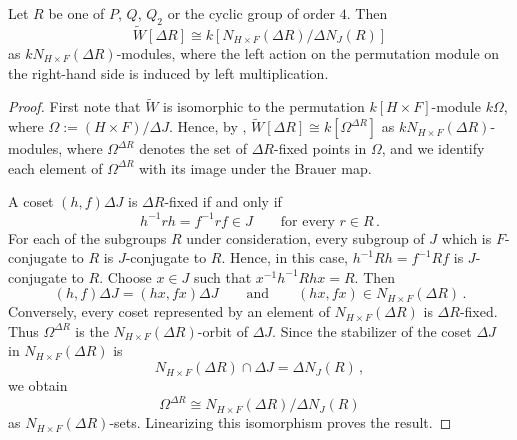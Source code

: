 \begin{lem}\label{lem:Brauer-fixed-points-W}
Let $R$ be one of $P$, $Q$, $Q_2$ or the cyclic group of order $4$. Then
\[
\widetilde{W}[\Delta R]\cong k[N_{H\times F}(\Delta R)/\Delta N_J(R)]
\]
as $kN_{H\times F}(\Delta R)$-modules, where the left action on the permutation module on the right-hand side is induced by left multiplication.
\end{lem}
\begin{proof}
    First note that $\widetilde{W}$ is isomorphic to the permutation $k[H\times F]$-module $k\Omega$, where $\Omega:=(H\times F)/\Delta J$. Hence, by \cite[Proposition~5.8.1]{LinckelmannVol1}, $\widetilde{W}[\Delta R]\cong k[\Omega^{\Delta R}]$ as $kN_{H\times F}(\Delta R)$-modules, where $\Omega^{\Delta R}$ denotes the set of $\Delta R$-fixed points in $\Omega$, and we identify each element of $\Omega^{\Delta R}$ with its image under the Brauer map.

    A coset $(h,f)\Delta J$ is $\Delta R$-fixed if and only if 
    \[
    h^{-1}rh=f^{-1}rf\in J\qquad \text{for every } r\in R\,.
    \]
    For each of the subgroups $R$ under consideration, every subgroup of
    $J$ which is $F$-conjugate to $R$ is $J$-conjugate to $R$. Hence, in this case, $h^{-1}Rh=f^{-1}Rf$ is $J$-conjugate to $R$. Choose $x\in J$ such that $x^{-1}h^{-1}Rhx=R$. Then
    \[
    (h,f)\Delta J=(hx,fx)\Delta J\qquad \text{and} \qquad (hx,fx)\in N_{H\times F}(\Delta R)\,.
    \]
    Conversely, every coset represented by an element of $N_{H\times F}(\Delta R)$ is $\Delta R$-fixed. Thus $\Omega^{\Delta R}$ is the $N_{H\times F}(\Delta R)$-orbit of $\Delta J$. Since the stabilizer of the coset $\Delta J$ in $N_{H\times F}(\Delta R)$ is
    \[
    N_{H\times F}(\Delta R)\cap \Delta J=\Delta N_J(R)\,,
    \]
    we obtain 
    \[
    \Omega^{\Delta R}\cong N_{H\times F}(\Delta R)/\Delta N_J(R)
    \]
    as $N_{H\times F}(\Delta R)$-sets. Linearizing this isomorphism proves the result.
\end{proof}



